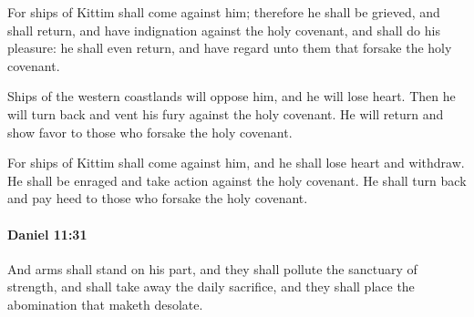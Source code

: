 			\begin{versebox}
					\item[BHS] 
					\item[LXX] 
					\item[ASV] For ships of Kittim shall come against him; therefore he shall be grieved, and shall return, and have indignation against the holy covenant, and shall do his pleasure: he shall even return, and have regard unto them that forsake the holy covenant.
					\item[NIV] Ships of the western coastlands will oppose him, and he will lose heart. Then he will turn back and vent his fury against the holy covenant. He will return and show favor to those who forsake the holy covenant.
					\item[NRSV] For ships of Kittim shall come against him, and he shall lose heart and withdraw. He shall be enraged and take action against the holy covenant. He shall turn back and pay heed to those who forsake the holy covenant.
			\end{versebox}

		\paragraph{Daniel 11:31} %
			\label{DANIEL-11-31}

			And arms shall stand on his part, and they shall pollute the sanctuary of strength, and shall take away the daily sacrifice, and they shall place the abomination that maketh desolate.

